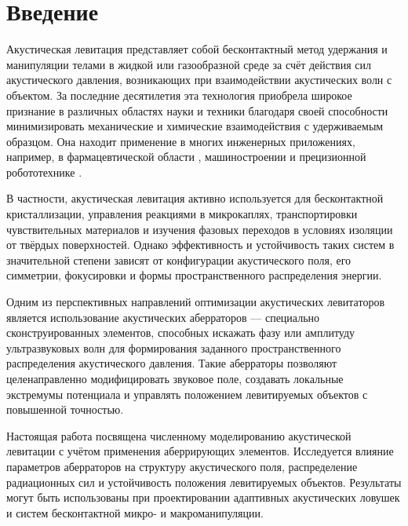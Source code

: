 \section{Введение}
\label{sec:Chapter0} 

Акустическая левитация представляет собой бесконтактный метод удержания и манипуляции телами в жидкой или газообразной среде за счёт действия сил акустического давления, возникающих при взаимодействии акустических волн с объектом. За последние десятилетия эта технология приобрела широкое признание в различных областях науки и техники благодаря своей способности минимизировать механические и химические взаимодействия с удерживаемым образцом. Она находит применение в многих инженерных приложениях, например, в фармацевтической области \cite{appliance_medicine}, машиностроении \cite{appliance_bearings} и прецизионной робототехнике \cite{appliance_robot}.

В частности, акустическая левитация активно используется для бесконтактной кристаллизации, управления реакциями в микрокаплях, транспортировки чувствительных материалов и изучения фазовых переходов в условиях изоляции от твёрдых поверхностей. Однако эффективность и устойчивость таких систем в значительной степени зависят от конфигурации акустического поля, его симметрии, фокусировки и формы пространственного распределения энергии.

Одним из перспективных направлений оптимизации акустических левитаторов является использование акустических аберраторов — специально сконструированных элементов, способных искажать фазу или амплитуду ультразвуковых волн для формирования заданного пространственного распределения акустического давления. Такие аберраторы позволяют целенаправленно модифицировать звуковое поле, создавать локальные экстремумы потенциала и управлять положением левитируемых объектов с повышенной точностью.

Настоящая работа посвящена численному моделированию акустической левитации с учётом применения аберрирующих элементов. Исследуется влияние параметров аберраторов на структуру акустического поля, распределение радиационных сил и устойчивость положения левитируемых объектов. Результаты могут быть использованы при проектировании адаптивных акустических ловушек и систем бесконтактной микро- и макроманипуляции.

\newpage
